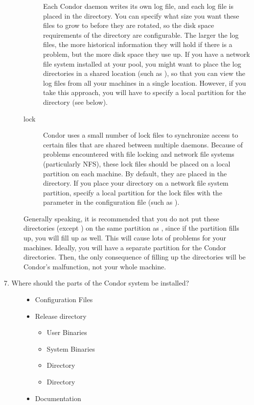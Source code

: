 \begin{description}
\begin{description}
\item[\File{log}] Each Condor daemon writes its own log file,
and each log file is placed
in the  directory.  You can specify what size you want these files
to grow to before they are rotated,
%
%
so the disk space requirements of
the directory are configurable.
The larger the log files, the more
historical information they will hold if there is a problem, but the
more disk space they use up.  If you have a network file system
installed at your pool, you might want to place the log directories in
a shared location (such as ),
so that you can view the log files from all your machines in a single
location.  However, if you take this approach, you will have to
specify a local partition for the  directory (see below).

\item[lock] Condor uses a small number of lock files to synchronize
access to certain files that are shared between multiple daemons.
Because of problems encountered with file locking and network
file systems (particularly NFS), these lock files should be placed on a
local partition on each machine.  By default, they are placed in
the  directory.  If you place your 
directory on a network file system partition,
specify a local partition for the
lock files with the  parameter in the configuration file (such as
).

\end{description}

Generally speaking, it is recommended that you do not put these directories
(except ) on the same partition as ,
since if the partition
fills up, you will fill up  as well. 
This will cause lots of
problems for your machines.  Ideally, you will have a separate partition
for the Condor directories. Then, the only consequence of filling up
the directories
will be Condor's malfunction, not your whole machine.

\item[7. Where should the parts of the Condor system be installed?]

	\begin{itemize}
	\item Configuration Files
	\item Release directory
		\begin{itemize}
		\item User Binaries
		\item System Binaries 
		\item {} Directory
	  	\item {} Directory
		\end{itemize}
	\item Documentation
	\end{itemize}


\end{description}
